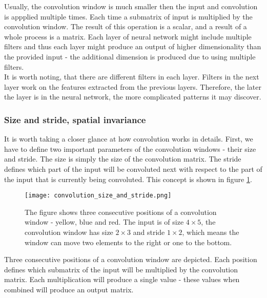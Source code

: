 \documentclass[a4paper,10pt]{report}
\begin{document}
	  Usually, the convolution window is much smaller then the input and convolution is appplied multiple times. Each time a  submatrix of input is multiplied by the convolution window. The result of this operation is a scalar, and a result of a whole process is a matrix. Each layer of neural network might include multiple filters and thus each layer might produce an output of higher dimensionality than the provided input - the additional dimension is produced due to using multiple filters.\\
	  
	  It is worth noting, that there are different filters in each layer. Filters in the next layer work on the features extracted from the previous layers. Therefore, the later the layer is in the neural network, the more complicated patterns it may discover.\\
	  
	  \subsubsection{Size and stride, spatial invariance}
	  
	  It is worth taking a closer glance at how convolution works in details. First, we have to define two important parameters of the convolution windows - their size and stride. The size is simply the size of the convolution matrix. The stride defines which part of the input will be convoluted next with respect to the part of the input that is currently being convoluted. This concept is shown in figure \ref{fig:convolution_size_and_stride}.\\
	  
	  
	  \begin{figure}[h!]
	    \centering
	    \texttt{[image: convolution\_size\_and\_stride.png]}
	    \caption{The figure shows three consecutive positions of a convolution window - yellow, blue and red. The input is of size $4\times5$, the convolution window has size $2\times3$ and stride $1\times2$, which means the window can move two elements to the right or one to the bottom.}
	    \label{fig:convolution_size_and_stride}
	  \end{figure} 
	  
	  Three consecutive positions of a convolution window are depicted. Each position defines which submatrix of the input will be multiplied by the convolution matrix. Each multiplication will produce a single value - these values when combined will produce an output matrix.\\
	  
\end{document}
